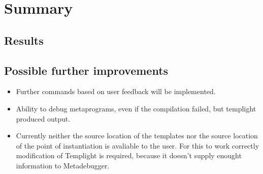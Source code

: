 
\chapter{Summary}

\section{Results}


\section{Possible further improvements}

\begin{itemize}
    \item
        Further commands based on user feedback will be implemented.
    \item
        Ability to debug metaprograms, even if the compilation failed, but
        templight produced output.
    \item
        Currently neither the source location of the templates nor the source
        location of the point of instantiation is avaliable to the user. For
        this to work correctly modification of Templight is required, because
        it doesn't supply enought information to Metadebugger.
\end{itemize}
